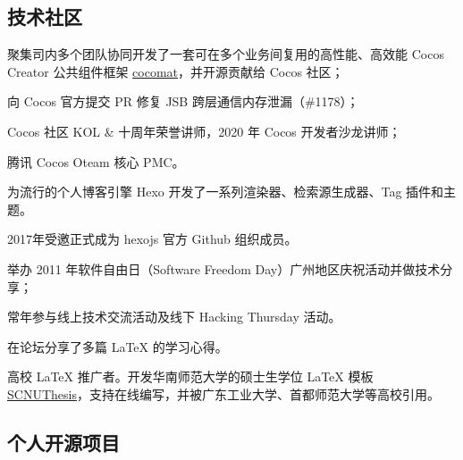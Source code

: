 \subsection{\hei 技术社区}

{
  \begin{tightitemize}%
  \item 聚集司内多个团队协同开发了一套可在多个业务间复用的高性能、高效能 Cocos Creator
    公共组件框架 \href{https://github.com/cocos/cocomat}{cocomat}，并开源贡献给 Cocos 社区；
  \item 向 Cocos 官方提交 PR 修复 JSB 跨层通信内存泄漏（\#1178）；
  \item Cocos 社区 KOL \& 十周年荣誉讲师，2020 年 Cocos 开发者沙龙讲师；
  \item 腾讯 Cocos Oteam 核心 PMC。
  \end{tightitemize}}

{
  \begin{tightitemize}%
  \item 为流行的个人博客引擎 Hexo 开发了一系列渲染器、检索源生成器、Tag 插件和主题。
  \item 2017年受邀正式成为 hexojs 官方 Github 组织成员。
  \end{tightitemize}}

{
  \begin{tightitemize}%
  \item 举办 2011 年软件自由日（Software Freedom Day）广州地区庆祝活动并做技术分享；
  \item 常年参与线上技术交流活动及线下 Hacking Thursday 活动。
  \end{tightitemize}}

{
  \begin{tightitemize}%
  \item 在论坛分享了多篇 \LaTeX{} 的学习心得。
  \item 高校 \LaTeX{} 推广者。开发华南师范大学的硕士生学位 \LaTeX{} 模板
    \href{https://github.com/scnu/scnuthesis}{SCNUThesis}，支持在线编写，并被广东工业大学、首都师范大学等高校引用。
  \end{tightitemize}}

\subsection{\hei 个人开源项目}

